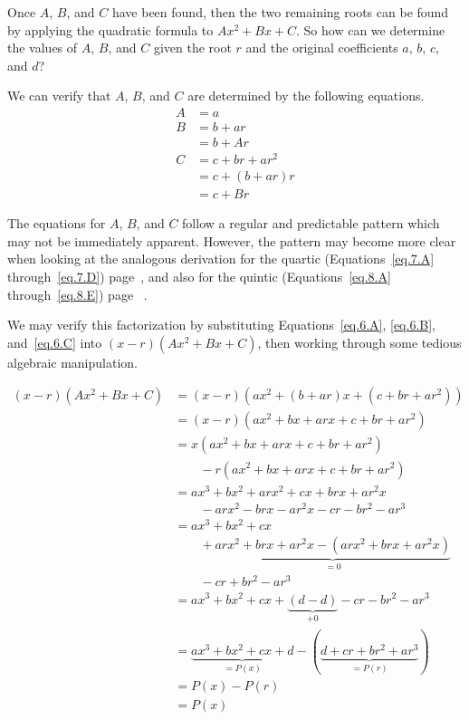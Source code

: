 Once $A$, $B$,
and $C$ have been found, then the two remaining roots can be found by
applying the quadratic formula to $A x^2 + B x + C$.  So how can we
determine the values of $A$, $B$, and $C$ given the root $r$ and the
original coefficients $a$, $b$, $c$, and $d$?


We can verify that $A$, $B$, and $C$ are determined by the following equations.
\begin{align}
 A &= a\label{eq.6.A}\\
  B &= b + a r\nonumber\\
   &= b + A r\label{eq.6.B}\\
  C &= c + b r + a r^2\nonumber\\
  &= c + (b + a r) r\nonumber\\
  &= c + B r\label{eq.6.C}
\end{align}

The equations for $A$, $B$, and $C$ follow a regular and predictable
pattern which may not be immediately apparent.  However, the pattern
may become more clear when looking at the analogous derivation for
the quartic (Equations~\eqref{eq.7.A} through~\eqref{eq.7.D})
page~\pageref{eq.7.D}, and also for the quintic
(Equations~\eqref{eq.8.A} through~\eqref{eq.8.E}) page
~\pageref{eq.8.E}.

We may verify this factorization by substituting Equations~\eqref{eq.6.A}, \eqref{eq.6.B}, and~\eqref{eq.6.C}
into $(x-r) (A x^2 + B x + C)$, then working through some tedious algebraic manipulation.

\begin{align*}
  (x-r) (A x^2 + B x + C)
  &= (x-r) (a x^2 + (b + a r) x + (c + b r + a r^2))\\
  &= (x-r) (a x^2 + b x + a r x + c + b r + a r^2)\\
  &= x(a x^2 + b x + a r x + c + b r + a r^2) \\
  &\quad\quad - r (a x^2 + b x + a r x + c + b r + a r^2)\\
  &= a x^3 + b x^2 + a r x^2 + c x + b r x + a r^2 x\\
  &\quad\quad - a r x^2 - b r x - a r^2 x - c r - b r^2 - a r^3\\
  &= a x^3 + b x^2 + c x  \\
  &\quad\quad + \underbrace{a r x^2 + b r x + a r^2 x - ( a r x^2 + b r x + a r^2 x)}_{=0} \\
  &\quad\quad  - c r + b r^2 - a r^3\\
  &= a x^3 + b x^2 + c x + \underbrace{( d - d)}_{+0} - c r - b r^2 - a r^3\\
  &= \underbrace{a x^3 + b x^2 + c x +  d}_{=P(x)} - (\underbrace{d + c r + b r^2 + a r^3}_{=P(r)})\\
  &= P(x) - P(r)\\
  &= P(x) 
\end{align*}

